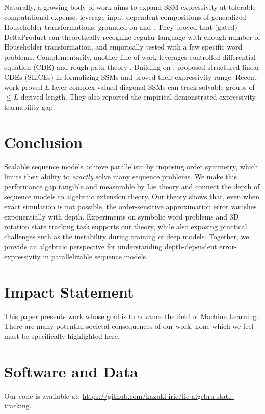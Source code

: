 \documentclass{article}
\theoremstyle{plain}
\theoremstyle{definition}
\theoremstyle{remark}
\begin{document}
Naturally, a growing body of work aims to expand SSM expressivity at tolerable computational expense.
\citet{siems2025deltaproduct} leverage input-dependent compositions of generalized Householder transformations, grounded on \citet{schlag2021linear} and \citet{yang2024parallelizing}.
They proved that (gated) DeltaProduct can theoretically recognize regular language with enough number of Householder transformation, and empirically tested with a few specific word problems.
Complementarily, another line of work leverages controlled differential equation (CDE) and rough path theory \cite{muca2024theoretical}.
Building on \citet{walker2024log},
\citet{walker2025structured} proposed structured linear CDEs (SLiCEs)
in formalizing SSMs and proved their expressivity range.
Recent work \cite{anonymous2025the} proved $L$-layer complex-valued diagonal SSMs can track solvable groups of $\le L$ derived length. They also reported the empirical demonstrated expressivity-learnability gap.
\section{Conclusion}
Scalable sequence models achieve parallelism by imposing order symmetry, which limits their ability to \emph{exactly} solve many sequence problems. We make this performance gap tangible and measurable by Lie theory and connect the depth of sequence models to algebraic extension theory. Our theory shows that, even when exact simulation is not possible, the order-sensitive approximation error vanishes exponentially with depth.
Experiments on symbolic word problems and 3D rotation state tracking task supports our theory, while also exposing practical challenges such as the instability during training of deep models. Together, we provide an algebraic perspective for understanding depth-dependent error-expressivity in parallelizable sequence models.

\section*{Impact Statement}
This paper presents work whose goal is to advance the field of Machine
Learning. There are many potential societal consequences of our work, none
which we feel must be specifically highlighted here.

\section*{Software and Data}
Our code is available at: \url{https://github.com/kazuki-irie/lie-algebra-state-tracking}.




\newpage
\appendix
\onecolumn




\end{document}
